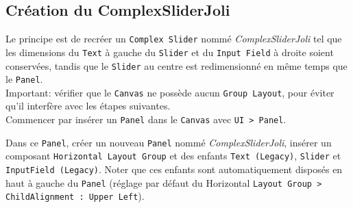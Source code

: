 \documentclass[a4paper,10pt]{article}
\newenvironment{solution}%
{\begin{tcolorbox}[breakable,colback=red!5!white,colframe=red!75!black,title=Solution]}%
{\end{tcolorbox}}
\begin{document}
\ifversionenseignant
\begin{solution}
	\subsection{Création du ComplexSliderJoli}
Le principe est de recréer un \texttt{Complex Slider} nommé \textit{ComplexSliderJoli} tel que les dimensions du \texttt{Text} à gauche du \texttt{Slider} et du \texttt{Input Field} à droite soient conservées, tandis que le \texttt{Slider} au centre est redimensionné en même temps que le \texttt{Panel}.\\

Important: vérifier que le \texttt{Canvas} ne possède aucun \texttt{Group Layout}, pour éviter qu'il interfère avec les étapes suivantes.\\

Commencer par insérer un \texttt{Panel} dans le \texttt{Canvas} avec \texttt{UI > Panel}.

Dans ce \texttt{Panel}, créer un nouveau \texttt{Panel} nommé \textit{ComplexSliderJoli}, insérer
un composant \texttt{Horizontal Layout Group} et
des enfants \texttt{Text (Legacy)}, \texttt{Slider} et \texttt{InputField (Legacy)}.
Noter que ces enfants sont automatiquement disposés en haut à gauche du \texttt{Panel} (réglage par défaut du Horizontal \texttt{Layout Group > ChildAlignment : Upper Left}).


\end{solution}
\end{document}
